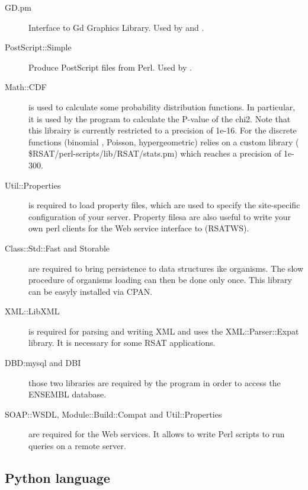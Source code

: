 \documentclass{book}
\begin{document}
\begin{description}
\item[GD.pm] Interface to Gd Graphics Library. Used by
   and .

\item[PostScript::Simple] Produce PostScript files from Perl. Used by
  .

\item[Math::CDF] is used to calculate some probability distribution
  functions. In particular, it is used by the program
   to calculate the P-value of the
  chi2. Note that this librairy is currently restricted to a precision
  of 1e-16. For the discrete functions (binomial , Poisson,
  hypergeometric) \RSAT relies on a custom library (
  \$RSAT/perl-scripts/lib/RSAT/stats.pm) which reaches a precision of
  1e-300.

\item[Util::Properties] is required to load property files, which are
  used to specify the site-specific configuration of your \RSAT
  server. Property filesa are also useful to write your own perl
  clients for the Web service interface to \RSAT (RSATWS).

\item[Class::Std::Fast and Storable] are required to bring persistence
  to data structures ike organisms. The slow procedure of organisms
  loading can then be done only once. This library can be easyly
  installed via CPAN.

\item[XML::LibXML] is required for parsing and writing XML and uses
  the XML::Parser::Expat library. It is necessary for some RSAT
  applications.

\item[DBD:mysql and DBI] those two libraries are required by the
  program  in order to access the
  ENSEMBL database.

\item[SOAP::WSDL, Module::Build::Compat and Util::Properties] are
  required for the Web services. It allows to write Perl scripts to
  run \RSAT queries on a remote server.

\end{description}

\subsection{Python language}
\end{document}
